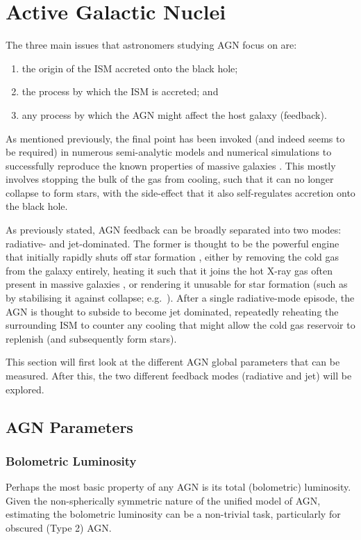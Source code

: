 \section{Active Galactic Nuclei}
	\label{sec:AGN}
	The three main issues that astronomers studying AGN focus on are:
	\begin{enumerate}
		\item the origin of the ISM accreted onto the black hole;
		\item the process by which the ISM is accreted; and
		\item any process by which the AGN might affect the host galaxy (feedback).
	\end{enumerate}
	As mentioned previously, the final point has been invoked (and indeed seems to be required) in numerous semi-analytic models and numerical simulations to successfully reproduce the known properties of massive galaxies \citep[e.g.][etc.]{DiMatteo2005, Bower2006, Springel2005}. This mostly involves stopping the bulk of the gas from cooling, such that it can no longer collapse to form stars, with the side-effect that it also self-regulates accretion onto the black hole.

	As previously stated, AGN feedback can be broadly separated into two modes: radiative- and jet-dominated. The former is thought to be the powerful engine that initially rapidly shuts off star formation \citep[e.g.][]{Thomas2005, Thomas2010}, either by removing the cold gas from the galaxy entirely, heating it such that it joins the hot X-ray gas often present in massive galaxies \citep[e.g.][]{OSullivan2001}, or rendering it unusable for star formation (such as by stabilising it against collapse; e.g.\ \citealt{Martig2009}). After a single radiative-mode episode, the AGN is thought to subside to become jet dominated, repeatedly reheating the surrounding ISM to counter any cooling that might allow the cold gas reservoir to replenish (and subsequently form stars). 

	This section will first look at the different AGN global parameters that can be measured. After this, the two different feedback modes (radiative and jet) will be explored.

	\subsection{AGN Parameters}
		\label{subsec:AGNparams}

		\subsubsection{Bolometric Luminosity}
			Perhaps the most basic property of any AGN is its total (bolometric) luminosity. Given the non-spherically symmetric nature of the unified model of AGN, estimating the bolometric luminosity can be a non-trivial task, particularly for obscured (Type 2) AGN. 

